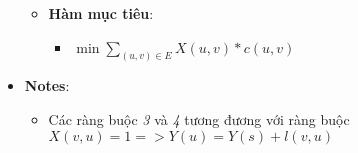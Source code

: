 \documentclass{article}
\begin{document}
\begin{itemize}
\begin{itemize}
\begin{itemize}
		\end{itemize}
		\item \textbf{Hàm mục tiêu}:
		\begin{itemize}
			\item $\min{\sum_{(u, v) \in E}^{} X(u, v) * c(u, v)}$
		\end{itemize}
	\end{itemize}
	\item \textbf{Notes}:
	\begin{itemize}
		\item Các ràng buộc \emph{3} và \emph{4} tương đương với ràng buộc $X(v, u) = 1 => Y(u) = Y(s) + l(v, u)$
	\end{itemize}
\end{itemize}
\end{document}
